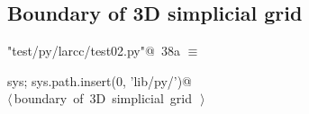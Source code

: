 \documentclass[11pt,oneside]{article}	%
\begin{document}
\subsection{Boundary of 3D simplicial grid}

\begin{flushleft} \small
\begin{minipage}{\linewidth} \label{scrap72}
\protect{}\verb@"test/py/larcc/test02.py"@\nobreak\ {\footnotesize 38a }$\equiv$
\vspace{-1ex}
\begin{list}{}{} \item
\mbox{}\verb@import sys; sys.path.insert(0, 'lib/py/')@\\
\mbox{}\verb@@\hbox{$\langle\,$boundary of 3D simplicial grid\nobreak\ {\footnotesize {}}$\,\rangle$}\verb@@\\
\mbox{}\verb@@{\NWsep}
\end{list}
\vspace{-2ex}
\end{minipage}\\[4ex]
\end{flushleft}
\end{document}
